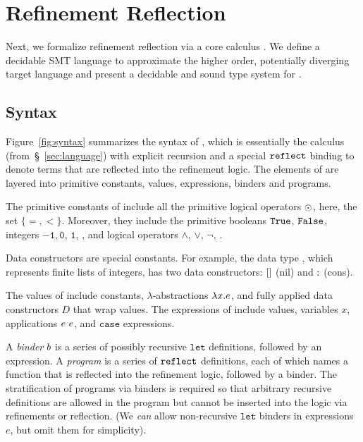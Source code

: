 \section{Refinement Reflection}
\label{sec:formalism}
\label{sec:types-reflection}
\label{sec:refinementreflection:theory}
Next, we formalize refinement reflection
via a core calculus \corelan.
%
We define a decidable SMT language \smtlan to approximate the
higher order, potentially diverging
target language \corelan
and present a decidable and sound type system
for \corelan.

\subsection{Syntax}

%
Figure~\ref{fig:syntax} summarizes the syntax of \corelan,
which is essentially the calculus \undeclang (from~\S~\ref{sec:language})
with explicit recursion and a special $\mathtt{reflect}$ binding
to denote terms that are reflected into the refinement logic.
%
The elements of \corelan are layered into
primitive constants, values, expressions, binders
and programs.

The primitive constants of \corelan
include all the primitive logical
operators $\odot$, here, the set $\{ =, <\}$.
%
Moreover, they include the
primitive booleans $\mathtt{True}$, $\mathtt{False}$,
integers $\mathtt{-1}, \mathtt{0}$, $\mathtt{1}$, \etc,
and logical operators $\mathtt{\land}$, $\mathtt{\lor}$, $\mathtt{\lnot}$, \etc.

%
Data constructors are special constants.
For example, the data type \tintlist, which represents
finite lists of integers, has two data constructors: $[]$ (nil)
and $:$ (cons).

%
The values of \corelan include
constants, $\lambda$-abstractions
$\lambda x. e$, and fully
applied data constructors $D$
that wrap values.
%
The expressions of \corelan
include values, variables $x$,
applications ${e} \ {e}$, and
$\mathtt{case}$ expressions.

%
A \emph{binder} $b$ is a series of possibly recursive
$\mathtt{let}$ definitions, followed by an expression.
%
A \emph{program} \prog is a series of $\mathtt{reflect}$
definitions, each of which names a function
that is reflected into the refinement
logic, followed by a binder.
%
The stratification of programs via binders
is required so that arbitrary recursive definitions
are allowed in the program but cannot be inserted into the logic
via refinements or reflection.
%
(We \emph{can} allow non-recursive $\mathtt{let}$
binders in expressions $e$, but omit them for simplicity).

